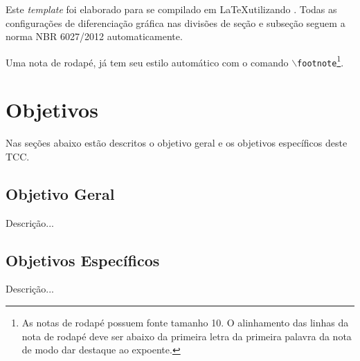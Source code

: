 Este \emph{template} foi elaborado para se compilado em \LaTeX utilizando \abnTeX.  Todas as configurações de diferenciação gráfica nas divisões de seção e subseção seguem a  norma NBR 6027/2012 automaticamente. 

Uma nota de rodapé, já tem seu estilo automático com o comando \texttt{$\backslash$footnote}\footnote{As notas de rodapé possuem fonte tamanho 10. O alinhamento das linhas da nota de rodapé deve ser abaixo da primeira letra da primeira palavra da nota de modo dar destaque ao expoente.}.


\section{Objetivos}

Nas seções abaixo estão descritos o objetivo geral e os objetivos específicos deste TCC.

\subsection{Objetivo Geral}

Descrição...

\subsection{Objetivos Específicos}

Descrição...
